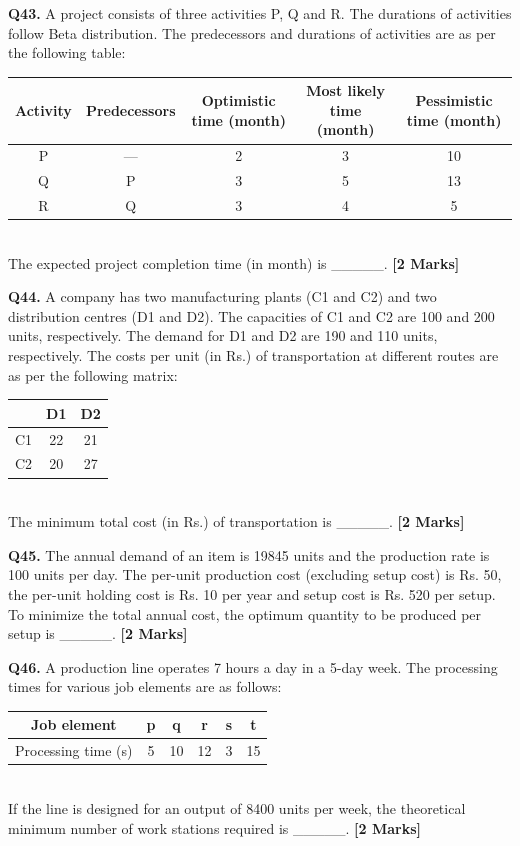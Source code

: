 \documentclass[11pt]{article}
\newcommand{\questionb}[2]{
    \noindent\textbf{Q#2.} #1 \hfill \textbf{[2 Marks]}
}
\begin{document}
\questionb{A project consists of three activities P, Q and R. The durations of activities follow Beta distribution. The predecessors and durations of activities are as per the following table: \\

\begin{tabular}{|c|c|c|c|c|}
\hline
Activity & Predecessors & Optimistic time (month) & Most likely time (month) & Pessimistic time (month) \\
\hline
P & — & 2 & 3 & 10 \\
Q & P & 3 & 5 & 13 \\
R & Q & 3 & 4 & 5 \\
\hline
\end{tabular} \\

The expected project completion time (in month) is \_\_\_\_\_.}{43}
\vspace{0.5cm}

\questionb{A company has two manufacturing plants (C1 and C2) and two distribution centres (D1 and D2). The capacities of C1 and C2 are 100 and 200 units, respectively. The demand for D1 and D2 are 190 and 110 units, respectively. The costs per unit (in Rs.) of transportation at different routes are as per the following matrix: \\

\begin{tabular}{|c|c|c|}
\hline
 & D1 & D2 \\
\hline
C1 & 22 & 21 \\
C2 & 20 & 27 \\
\hline
\end{tabular} \\

The minimum total cost (in Rs.) of transportation is \_\_\_\_\_.}{44}
\vspace{0.5cm}

\questionb{The annual demand of an item is 19845 units and the production rate is 100 units per day. The per-unit production cost (excluding setup cost) is Rs. 50, the per-unit holding cost is Rs. 10 per year and setup cost is Rs. 520 per setup. To minimize the total annual cost, the optimum quantity to be produced per setup is \_\_\_\_\_.}{45}
\vspace{0.5cm}

\questionb{A production line operates 7 hours a day in a 5-day week. The processing times for various job elements are as follows: \\

\begin{tabular}{|c|c|c|c|c|c|}
\hline
Job element & p & q & r & s & t \\
\hline
Processing time (s) & 5 & 10 & 12 & 3 & 15 \\
\hline
\end{tabular} \\

If the line is designed for an output of 8400 units per week, the theoretical minimum number of work stations required is \_\_\_\_\_.}{46}
\vspace{0.5cm}
\end{document}
